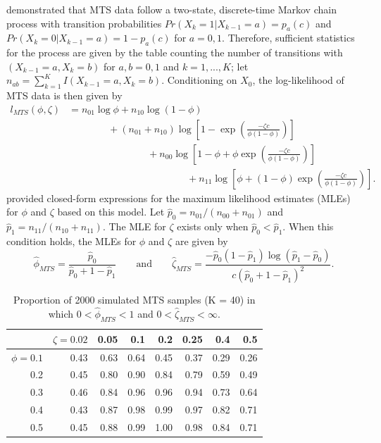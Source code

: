 \documentclass[man, noextraspace, floatsintext]{apa6}\usepackage[]{graphicx}\usepackage[]{color}
\begin{document}
\citet{Brown1977estimation} demonstrated that MTS data follow a two-state, discrete-time Markov chain process with transition probabilities $Pr(X_k = 1 | X_{k-1} = a) = p_a(c)$ and $Pr(X_k = 0 | X_{k-1} = a) = 1 - p_a(c)$ for $a = 0,1$. 
Therefore, sufficient statistics for the process are given by the table counting the number of transitions with $(X_{k-1} = a, X_k = b)$ for $a,b = 0,1$ and $k = 1,...,K$; let $n_{ab} = \sum_{k=1}^K I(X_{k-1} = a, X_k = b)$. 
Conditioning on $X_0$, the log-likelihood of MTS data is then given by \begin{equation}
\begin{aligned}
\label{eq:MTS_loglik}
l_{MTS}(\phi, \zeta) &= n_{01} \log \phi + n_{10} \log\left(1 - \phi\right) \\
& \qquad \qquad + \left(n_{01} + n_{10}\right) \log \left[1 - \exp\left(\frac{-\zeta c}{\phi (1 - \phi)}\right)\right] \\
& \qquad \qquad \qquad \qquad + n_{00} \log\left[1 - \phi + \phi \exp\left(\frac{-\zeta c}{\phi (1 - \phi)}\right)\right]\\
& \qquad \qquad \qquad \qquad \qquad \qquad + n_{11}\log\left[\phi + \left(1 - \phi\right)\exp\left(\frac{-\zeta c}{\phi (1 - \phi)}\right)\right].
\end{aligned}
\end{equation}
\citet{Brown1977estimation} provided closed-form expressions for the maximum likelihood estimates (MLEs) for $\phi$ and $\zeta$ based on this model. Let $\hat{p}_0 = n_{01}/ \left(n_{00} + n_{01}\right)$ and $\hat{p}_1 = n_{11} / \left(n_{10} + n_{11}\right)$. The MLE for $\zeta$ exists only when $\hat{p}_0 < \hat{p}_1$. 
When this condition holds, the MLEs for $\phi$ and $\zeta$ are given by 
\begin{equation}
\label{eq:MTS_mle}
\hat\phi_{MTS} = \frac{\hat{p}_0}{\hat{p}_0 + 1 - \hat{p}_1} \qquad \text{and} \qquad
\hat\zeta_{MTS} = \frac{-\hat{p}_0 \left(1 - \hat{p}_1\right) \log(\hat{p}_1 - \hat{p}_0)}{c \left(\hat{p}_0 + 1 - \hat{p}_1\right)^2}.
\end{equation}



\begin{table}[b]
\centering
\caption{Proportion of 2000 simulated MTS samples (K = 40) in which $0 < \hat\phi_{MTS} < 1$ and $0 < \hat\zeta_{MTS} < \infty$.} 
\label{tab:MTS_zeta_valid}
\begin{tabular}{rrrrrrrr}
  \hline
 & $\zeta = 0.02$ & 0.05 & 0.1 & 0.2 & 0.25 & 0.4 & 0.5 \\ 
  \hline
$\phi = 0.1$ & 0.43 & 0.63 & 0.64 & 0.45 & 0.37 & 0.29 & 0.26 \\ 
  0.2 & 0.45 & 0.80 & 0.90 & 0.84 & 0.79 & 0.59 & 0.49 \\ 
  0.3 & 0.46 & 0.84 & 0.96 & 0.96 & 0.94 & 0.73 & 0.64 \\ 
  0.4 & 0.43 & 0.87 & 0.98 & 0.99 & 0.97 & 0.82 & 0.71 \\ 
  0.5 & 0.45 & 0.88 & 0.99 & 1.00 & 0.98 & 0.84 & 0.71 \\ 
   \hline
\end{tabular}
\end{table}
\end{document}
